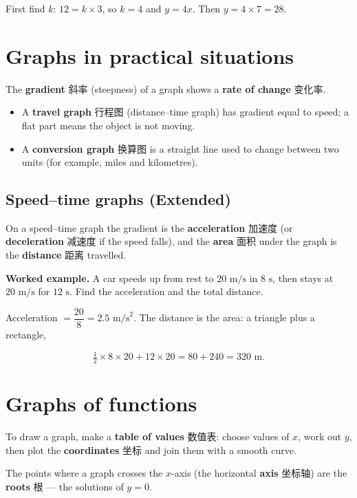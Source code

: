 \documentclass[11pt]{article}
\begin{document}
First find $k$: $12 = k \times 3$, so $k = 4$ and $y = 4x$. Then $y = 4 \times 7 = 28$.

\section*{Graphs in practical situations}

The \textbf{gradient} 斜率 (steepness) of a graph shows a \textbf{rate of change} 变化率.

\begin{itemize}
\item A \textbf{travel graph} 行程图 (distance–time graph) has gradient equal to speed; a flat part means the object is not moving.

\item A \textbf{conversion graph} 换算图 is a straight line used to change between two units (for example, miles and kilometres).

\end{itemize}

\subsection*{Speed–time graphs (Extended)}

On a speed–time graph the gradient is the \textbf{acceleration} 加速度 (or \textbf{deceleration} 减速度 if the speed falls), and the \textbf{area} 面积 under the graph is the \textbf{distance} 距离 travelled.

\textbf{Worked example.} A car speeds up from rest to $20\text{ m/s}$ in $8\text{ s}$, then stays at $20\text{ m/s}$ for $12\text{ s}$. Find the acceleration and the total distance.

Acceleration $= \dfrac{20}{8} = 2.5\text{ m/s}^{2}$. The distance is the area: a triangle plus a rectangle,

\[
\tfrac{1}{2} \times 8 \times 20 + 12 \times 20 = 80 + 240 = 320\text{ m}.
\]

\section*{Graphs of functions}

To draw a graph, make a \textbf{table of values} 数值表: choose values of $x$, work out $y$, then plot the \textbf{coordinates} 坐标 and join them with a smooth curve.

The points where a graph crosses the $x$-axis (the horizontal \textbf{axis} 坐标轴) are the \textbf{roots} 根 — the solutions of $y = 0$.
\end{document}
